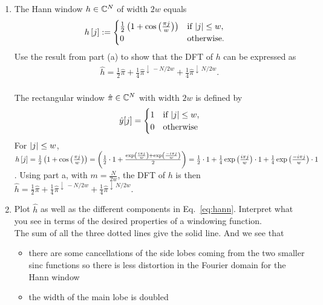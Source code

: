 \documentclass[12pt,twoside]{article}
\begin{document}
\begin{enumerate}
\begin{enumerate}
 \item The Hann window $h \in \mathbb{C}^{N}$ of width $2w$ equals
\begin{align}
h\left[ j \right] & :=  
 \begin{cases}
  \frac{1}{2} \left( 1 + \cos \left(  \frac{ \pi j}{w} \right) \right) & \text{if } \lvert j\rvert \leq w,\\
   0 & \text{otherwise.}
  \end{cases}
\end{align} 
Use the result from part (a) to show that the DFT of $h$ can be expressed as
\begin{align}
\label{eq:hann}
\hat{h} = \frac{1}{2}\hat{\pi} + \frac{1}{4}\hat{\pi}^{\downarrow \, -N/2w} + \frac{1}{4}\hat{\pi}^{\downarrow \, N/2w}.
\end{align}\\
 The rectangular window $\hat{\pi} \in  \mathbb{C}^{N}$ with width $2w$ is defined by
\begin{equation*}
  \hat{y}[j] =
    \begin{cases}
      1 & \text{if } \lvert j\rvert \leq w,\\
      0 & \text{otherwise}
    \end{cases}       
\end{equation*}
For $\lvert j\rvert \leq w$, $h\left[ j \right] =  \frac{1}{2} \left( 1 + \cos \left(  \frac{ \pi j}{w} \right) \right) =  \left( \frac{1}{2}  \cdot 1 +  \frac{ \exp \left( \frac{i \pi j}{w}  \right) 
+  \exp \left( \frac{-i \pi j}{w}  \right)} {2}  \right) = \frac{1}{2}  \cdot 1  +  \frac{1}{4}  \exp \left( \frac{i \pi j}{w}  \right) \cdot 1 + \frac{1}{4}  \exp \left( \frac{-i \pi j}{w}  \right) \cdot 1$.
Using part a, with $m= \frac{N}{2w}$, the DFT of  $h$ is then $\hat{h} = \frac{1}{2}\hat{\pi} + \frac{1}{4}\hat{\pi}^{\downarrow \, -N/2w} + \frac{1}{4}\hat{\pi}^{\downarrow \, N/2w}$.


\item Plot $\hat{h}$ as well as the different components in Eq.~\eqref{eq:hann}. Interpret what you see in terms of the desired properties of a windowing function. \\
The sum of all the three dotted lines give the solid line. And we see that
\begin{itemize}
	\item there are some cancellations of the side lobes coming from the two smaller sinc functions so there is less distortion in the Fourier domain for the Hann window 
	\item the width of the main lobe is doubled
\end{itemize}


\end{enumerate}
\end{enumerate}
\end{document}
